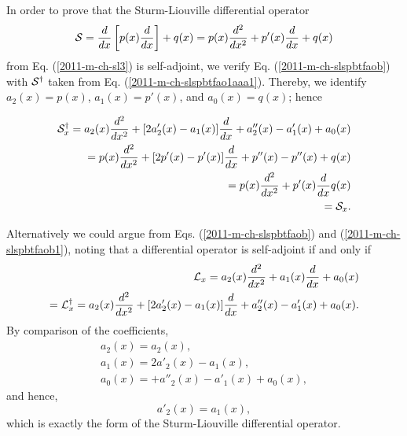 {\color{OliveGreen}
\bproof

In order to prove that the  Sturm-Liouville differential operator
\begin{equation}
\begin{split}
{\cal S}
=       \frac{d}{dx}
\left[
p(x)
\frac{d}{dx}
\right]
+
q(x)
= p(x) \frac{d^2}{dx^2}
+p'(x) \frac{d}{dx}
+q(x)
\end{split}
\label{2011-m-ch-slspbtfaoc}
\end{equation}
from Eq. (\ref{2011-m-ch-sl3})
is self-adjoint, we verify
Eq. (\ref{2011-m-ch-slspbtfaob})
with
${\cal S}^\dagger$
taken from
Eq. (\ref{2011-m-ch-slspbtfao1aaa1}).
Thereby, we identify
$a_2(x) = p(x)$,
$a_1(x) = p'(x)$,
and
$a_0(x) = q(x)$; hence

\begin{equation}
\begin{split}
{\cal S}_x^\dagger
=a_2(x) \frac{d^2}{dx^2}
+
[2 a'_2(x)- a_1(x) ]  \frac{d}{dx}
+ a''_2(x)   - a'_1(x)   + a_0(x) \\
\qquad =
p(x)  \frac{d^2}{dx^2}
+ [2 p'(x)-p'(x)] \frac{d}{dx}
+p''(x)-p''(x)+q(x) \\
\qquad =
p(x)  \frac{d^2}{dx^2}
+ p'(x) \frac{d}{dx}
q(x)\\
\qquad = {\cal S}_x
.
\end{split}
\end{equation}

Alternatively we could argue from Eqs. (\ref{2011-m-ch-slspbtfaob}) and (\ref{2011-m-ch-slspbtfaob1}),
noting that
a differential operator is self-adjoint if and only if
\begin{equation}
\begin{split}
 {\cal L}_x
=a_2(x) \frac{d^2}{dx^2}   +  a_1(x)\frac{d }{dx }    + a_0(x) \\
=   {\cal L}_x^\dagger =
 a_2(x) \frac{d^2}{dx^2}
+
[2 a'_2(x)- a_1(x) ]  \frac{d}{dx}
+ a''_2(x)   - a'_1(x)   + a_0(x)
.
\end{split}
\end{equation}
By comparison of the coefficients,
\begin{equation}
\begin{split}
a_2(x)=a_2(x),\\
a_1(x) =
2 a'_2(x)- a_1(x)   ,\\
a_0(x) =
+ a''_2(x)   - a'_1(x)   + a_0(x)
,
\end{split}
\end{equation}
and hence,
\begin{equation}
 a'_2(x)= a_1(x),
\end{equation}
which is exactly the form of the   Sturm-Liouville differential operator.

\eproof
}


